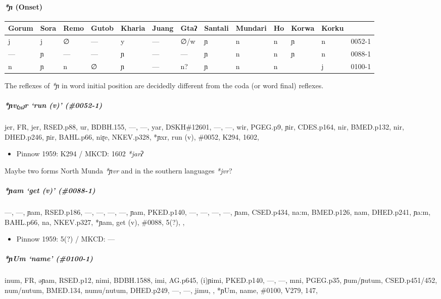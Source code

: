 \documentclass[a4paper,]{article}
\providecommand{\tightlist}{%
  \setlength{\itemsep}{0pt}\setlength{\parskip}{0pt}}
\let\oldparagraph\paragraph
\renewcommand{\paragraph}[1]{\oldparagraph{#1}\mbox{}}
\let\oldsubparagraph\subparagraph
\renewcommand{\subparagraph}[1]{\oldsubparagraph{#1}\mbox{}}
\begin{document}
\paragraph{\texorpdfstring{\emph{*ɲ}
(Onset)}{*ɲ (Onset)}}\label{ux272-onset}

\begin{longtable}[]{@{}lllllllllllll@{}}
\toprule
Gorum & Sora & Remo & Gutob & Kharia & Juang & Gtaʔ & Santali & Mundari
& Ho & Korwa & Korku &\tabularnewline
\midrule
\endhead
j & j & ∅ & --- & y & --- & ∅/w & ɲ & n & n & ɲ & n &
0052-1\tabularnewline
--- & ɲ & --- & --- & ɲ & --- & --- & ɲ & n & n & ɲ & n &
0088-1\tabularnewline
n & ɲ & n & ∅ & ɲ & --- & n? & ɲ & n & n & & j & 0100-1\tabularnewline
\bottomrule
\end{longtable}

The reflexes of \emph{*ɲ} in word initial position are decidedly
different from the coda (or word final) reflexes.

\subparagraph{\texorpdfstring{\emph{*ɲv₍₂₆₎r} `run (v)'
(\#0052-1)}{*ɲv₍₂₆₎r run (v) (\#0052-1)}}\label{ux272vr-run-v-0052-1}

jer, FR, jer, RSED.p88, ur, BDBH.155, ---, ---, yar, DSKH\#12601, ---,
---, wir, PGEG.p9, ɲir, CDES.p164, nir, BMED.p132, nir, DHED.p246, ɲir,
BAHL.p66, niɽe, NKEV.p328, *ɲxr, run (v), \#0052, K294, 1602,

\begin{itemize}
\tightlist
\item
  Pinnow 1959: K294 / MKCD: 1602 \emph{*jarʔ}
\end{itemize}

Maybe two forms North Munda \emph{*ɲvr} and in the southern languages
\emph{*jvr}?

\subparagraph{\texorpdfstring{\emph{*ɲam} `get (v)'
(\#0088-1)}{*ɲam get (v) (\#0088-1)}}\label{ux272am-get-v-0088-1}

---, ---, ɲam, RSED.p186, ---, ---, ---, ---, ɲam, PKED.p140, ---, ---,
---, ---, ɲam, CSED.p434, na:m, BMED.p126, nam, DHED.p241, ɲa:m,
BAHL.p66, na, NKEV.p327, *ɲam, get (v), \#0088, 5(?), ,

\begin{itemize}
\tightlist
\item
  Pinnow 1959: 5(?) / MKCD: ---
\end{itemize}

\subparagraph{\texorpdfstring{\emph{*ɲUm} `name'
(\#0100-1)}{*ɲUm name (\#0100-1)}}\label{ux272um-name-0100-1}

inum, FR, əɲam, RSED.p12, nimi, BDBH.1588, imi, AG.p645, (i)ɲimi,
PKED.p140, ---, ---, mni, PGEG.p35, ɲum/ɲutum, CSED.p451/452, num/nutum,
BMED.134, numu/nutum, DHED.p249, ---, ---, jimu, , *ɲUm, name, \#0100,
V279, 147,
\end{document}
